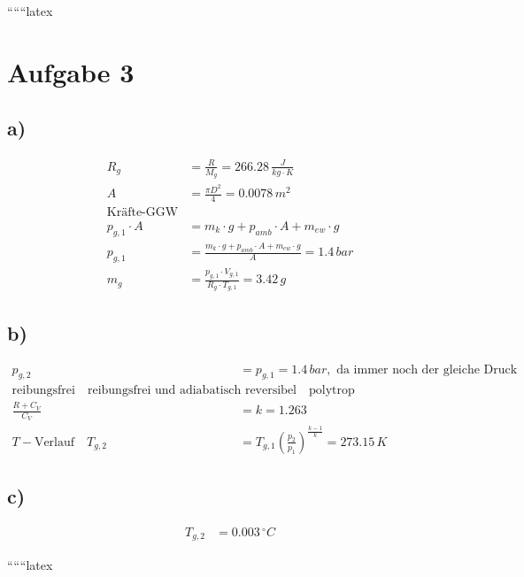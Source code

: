 
``````latex


\section*{Aufgabe 3}

\subsection*{a)}
\begin{align*}
R_g &= \frac{R}{M_g} = 266.28 \, \frac{J}{kg \cdot K} \\
A &= \frac{\pi D^2}{4} = 0.0078 \, m^2 \\
\text{Kräfte-GGW} \\
p_{g,1} \cdot A &= m_k \cdot g + p_{amb} \cdot A + m_{ew} \cdot g \\
p_{g,1} &= \frac{m_k \cdot g + p_{amb} \cdot A + m_{ew} \cdot g}{A} = 1.4 \, bar \\
m_g &= \frac{p_{g,1} \cdot V_{g,1}}{R_g \cdot T_{g,1}} = 3.42 \, g
\end{align*}

\subsection*{b)}
\begin{align*}
p_{g,2} &= p_{g,1} = 1.4 \, bar, \text{ da immer noch der gleiche Druck durch Atmosphäre und Gewicht wirkt.} \\
\text{reibungsfrei} \quad \text{reibungsfrei und adiabatisch reversibel} \quad \text{polytrop} \\
\frac{R + C_V}{C_V} &= k = 1.263 \\
T-\text{Verlauf} \quad T_{g,2} &= T_{g,1} \left( \frac{p_2}{p_1} \right)^{\frac{k-1}{k}} = 273.15 \, K
\end{align*}

\subsection*{c)}
\begin{align*}
T_{g,2} &= 0.003 \, ^\circ C
\end{align*}


``````latex

